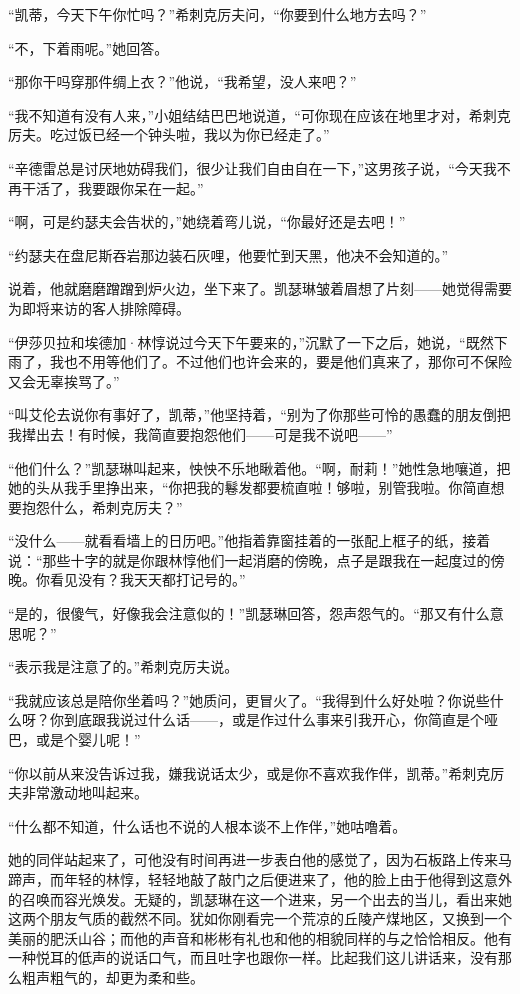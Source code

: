 \par “凯蒂，今天下午你忙吗？”希刺克厉夫问，“你要到什么地方去吗？”
\par “不，下着雨呢。”她回答。
\par “那你干吗穿那件绸上衣？”他说，“我希望，没人来吧？”
\par “我不知道有没有人来，”小姐结结巴巴地说道，“可你现在应该在地里才对，希刺克厉夫。吃过饭已经一个钟头啦，我以为你已经走了。”
\par “辛德雷总是讨厌地妨碍我们，很少让我们自由自在一下，”这男孩子说，“今天我不再干活了，我要跟你呆在一起。”
\par “啊，可是约瑟夫会告状的，”她绕着弯儿说，“你最好还是去吧！”
\par “约瑟夫在盘尼斯吞岩那边装石灰哩，他要忙到天黑，他决不会知道的。”
\par 说着，他就磨磨蹭蹭到炉火边，坐下来了。凯瑟琳皱着眉想了片刻——她觉得需要为即将来访的客人排除障碍。
\par “伊莎贝拉和埃德加·林惇说过今天下午要来的，”沉默了一下之后，她说，“既然下雨了，我也不用等他们了。不过他们也许会来的，要是他们真来了，那你可不保险又会无辜挨骂了。”
\par “叫艾伦去说你有事好了，凯蒂，”他坚持着，“别为了你那些可怜的愚蠢的朋友倒把我撵出去！有时候，我简直要抱怨他们——可是我不说吧——”
\par “他们什么？”凯瑟琳叫起来，怏怏不乐地瞅着他。“啊，耐莉！”她性急地嚷道，把她的头从我手里挣出来，“你把我的鬈发都要梳直啦！够啦，别管我啦。你简直想要抱怨什么，希刺克厉夫？”
\par “没什么——就看看墙上的日历吧。”他指着靠窗挂着的一张配上框子的纸，接着说：“那些十字的就是你跟林惇他们一起消磨的傍晚，点子是跟我在一起度过的傍晚。你看见没有？我天天都打记号的。”
\par “是的，很傻气，好像我会注意似的！”凯瑟琳回答，怨声怨气的。“那又有什么意思呢？”
\par “表示我是注意了的。”希刺克厉夫说。
\par “我就应该总是陪你坐着吗？”她质问，更冒火了。“我得到什么好处啦？你说些什么呀？你到底跟我说过什么话——，或是作过什么事来引我开心，你简直是个哑巴，或是个婴儿呢！”
\par “你以前从来没告诉过我，嫌我说话太少，或是你不喜欢我作伴，凯蒂。”希刺克厉夫非常激动地叫起来。
\par “什么都不知道，什么话也不说的人根本谈不上作伴，”她咕噜着。
\par 她的同伴站起来了，可他没有时间再进一步表白他的感觉了，因为石板路上传来马蹄声，而年轻的林惇，轻轻地敲了敲门之后便进来了，他的脸上由于他得到这意外的召唤而容光焕发。无疑的，凯瑟琳在这一个进来，另一个出去的当儿，看出来她这两个朋友气质的截然不同。犹如你刚看完一个荒凉的丘陵产煤地区，又换到一个美丽的肥沃山谷；而他的声音和彬彬有礼也和他的相貌同样的与之恰恰相反。他有一种悦耳的低声的说话口气，而且吐字也跟你一样。比起我们这儿讲话来，没有那么粗声粗气的，却更为柔和些。
